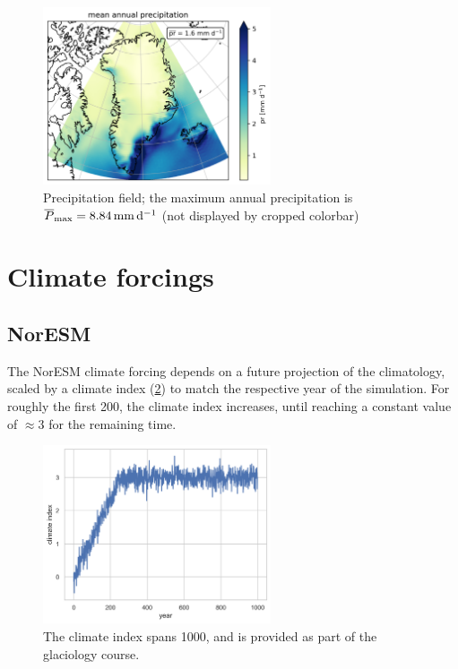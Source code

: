 \begin{figure}
	\centering
	\includegraphics[width=0.6\textwidth]{../../era5/figs/pr-annual-mean.png}
	\caption{Precipitation field; the maximum annual precipitation is \(\mean{P}_{\text{max}} = \SI{8.84}{\mm\per\day}\) (not displayed by cropped colorbar)}
	\label{fig:era5-pr}
\end{figure}

\section{Climate forcings}

\subsection{NorESM}\label{app:forcing-noresm}

The NorESM climate forcing depends on a future projection of the climatology, scaled by a climate index (\cref{fig:climate-index}) to match the respective year of the simulation. For roughly the first \SI{200}{\year}, the climate index increases, until reaching a constant value of \(\approx\num{3}\) for the remaining time.  

\begin{figure}
	\centering
	\includegraphics[width=0.6\textwidth]{../global-warming/figs/climate-index.png}
	\caption{The climate index spans \SI{1000}{\year}, and is provided as part of the glaciology course.}
	\label{fig:climate-index}
\end{figure}

